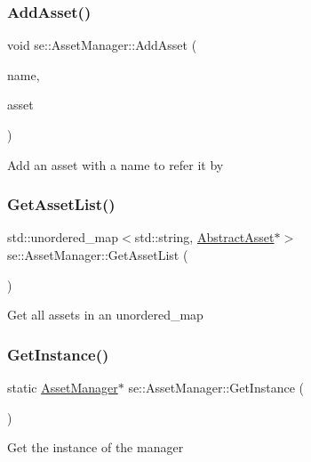 \subsubsection{\texorpdfstring{Add\+Asset()}{AddAsset()}}
{\footnotesize\ttfamily void se\+::\+Asset\+Manager\+::\+Add\+Asset (\begin{DoxyParamCaption}\item[{const std\+::string \&}]{name,  }\item[{\mbox{\hyperlink{classse_1_1_abstract_asset}{Abstract\+Asset}} $\ast$}]{asset }\end{DoxyParamCaption})}

Add an asset with a name to refer it by \mbox{\label{classse_1_1_asset_manager_adaa14ad4d80b328f2204543d788c6a28}} 
\subsubsection{\texorpdfstring{Get\+Asset\+List()}{GetAssetList()}}
{\footnotesize\ttfamily std\+::unordered\+\_\+map$<$std\+::string, \mbox{\hyperlink{classse_1_1_abstract_asset}{Abstract\+Asset}}$\ast$$>$ se\+::\+Asset\+Manager\+::\+Get\+Asset\+List (\begin{DoxyParamCaption}{ }\end{DoxyParamCaption})}

Get all assets in an unordered\+\_\+map \mbox{\label{classse_1_1_asset_manager_abcccad608538c6ddeb223c259089d468}} 
\subsubsection{\texorpdfstring{Get\+Instance()}{GetInstance()}}
{\footnotesize\ttfamily static \mbox{\hyperlink{classse_1_1_asset_manager}{Asset\+Manager}}$\ast$ se\+::\+Asset\+Manager\+::\+Get\+Instance (\begin{DoxyParamCaption}{ }\end{DoxyParamCaption})\hspace{0.3cm}{\ttfamily [static]}}

Get the instance of the manager \mbox{\label{classse_1_1_asset_manager_a3cd3506b7003d63adbd1cd0f94c8931e}} 

